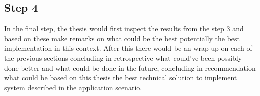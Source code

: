 \documentclass[article,11pt]{article}
\begin{document}
\subsection*{Step 4}

In the final step, the thesis would first inspect the results from the step 3 and based on these make remarks on what could be the best potentially the best implementation in this context.
After this there would be an wrap-up on each of the previous sections concluding in retrospective what could've been possibly done better and what could be done in the future, concluding in recommendation what could be based on this thesis the best technical solution to implement system described in the application scenario. 


\printbibliography
\end{document}
